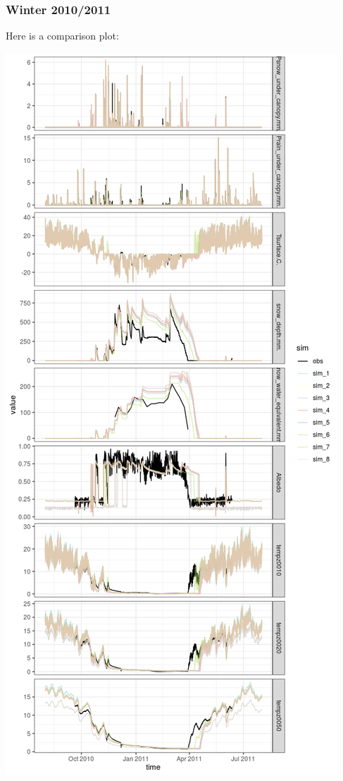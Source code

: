 \documentclass[
]{article}
\begin{document}
\hypertarget{winter-20102011}{%
\subsubsection{Winter 2010/2011}\label{winter-20102011}}

Here is a comparison plot:

\includegraphics{coldelaporte_v6_files/figure-latex/Winter_2010_2011-1.png}
\end{document}
